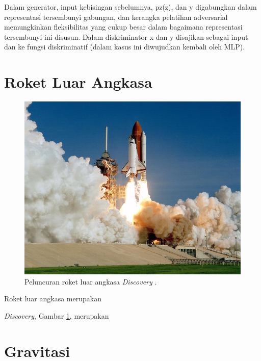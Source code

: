 Dalam generator, input kebisingan sebelumnya, pz(z), dan y digabungkan dalam representasi tersembunyi gabungan, dan kerangka pelatihan adversarial memungkinkan fleksibilitas yang cukup besar dalam bagaimana representasi tersembunyi ini disusun. 
Dalam diskriminator x dan y disajikan sebagai input dan ke fungsi diskriminatif (dalam kasus ini diwujudkan kembali oleh MLP). \parencite{CGAN}

\section{Roket Luar Angkasa}
\label{sec:roketluarangkasa}

\begin{figure}[ht]
  \centering

  \includegraphics[scale=0.35]{gambar/roketluarangkasa.jpg}

  \caption{Peluncuran roket luar angkasa \emph{Discovery} \parencite{roketluarangkasa}.}
  \label{fig:roketluarangkasa}
\end{figure}

Roket luar angkasa merupakan \lipsum[1]

\emph{Discovery}, Gambar \ref{fig:roketluarangkasa}, merupakan \lipsum[2]

\section{Gravitasi}
\label{sec:gravitasi}

